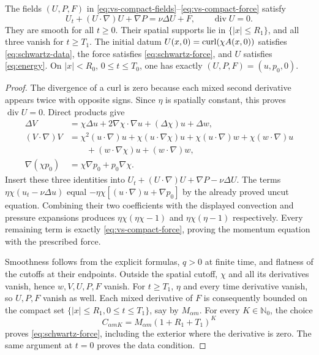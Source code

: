 \begin{proposition}
The fields $(U,P,F)$ in
\eqref{eq:vs-compact-fields}--\eqref{eq:vs-compact-force} satisfy
\[
 U_t+(U\cdot\nabla)U+\nabla P=\nu\Delta U+F,
 \qquad \operatorname{div}U=0.
\]
They are smooth for all $t\geq0$. Their spatial supports lie in
$\{|x|\leq R_1\}$, and all three vanish for $t\geq T_1$.
The initial datum $U(x,0)=\operatorname{curl}(\chi A(x,0))$ satisfies
\eqref{eq:schwartz-data}, the force satisfies
\eqref{eq:schwartz-force}, and $U$ satisfies \eqref{eq:energy}.
On $|x|<R_0$, $0\leq t\leq T_0$, one has exactly
$(U,P,F)=(u,p_0,0)$.
\end{proposition}
\begin{proof}
The divergence of a curl is zero because each mixed second derivative
appears twice with opposite signs. Since $\eta$ is spatially constant,
this proves $\operatorname{div}U=0$. Direct products give
\begin{align*}
 \Delta V&=\chi\Delta u+2\nabla\chi\cdot\nabla u
              +(\Delta\chi)u+\Delta w,\\
 (V\cdot\nabla)V
 &=\chi^2(u\cdot\nabla)u+\chi(u\cdot\nabla\chi)u
   +\chi(u\cdot\nabla)w+\chi(w\cdot\nabla)u\\
 &\qquad +(w\cdot\nabla\chi)u+(w\cdot\nabla)w,\\
 \nabla(\chi p_0)&=\chi\nabla p_0+p_0\nabla\chi.
\end{align*}
Insert these three identities into
$U_t+(U\cdot\nabla)U+\nabla P-\nu\Delta U$.
The terms $\eta\chi(u_t-\nu\Delta u)$ equal
$-\eta\chi[(u\cdot\nabla)u+\nabla p_0]$ by the already proved
uncut equation. Combining their two coefficients with the displayed
convection and pressure expansions produces
$\eta\chi(\eta\chi-1)$ and $\eta\chi(\eta-1)$ respectively.
Every remaining term is exactly \eqref{eq:vs-compact-force}, proving
the momentum equation with the prescribed force.

Smoothness follows from the explicit formulas, $q>0$ at finite time,
and flatness of the cutoffs at their endpoints. Outside the spatial
cutoff, $\chi$ and all its derivatives vanish, hence $w,V,U,P,F$
vanish. For $t\geq T_1$, $\eta$ and every time derivative vanish,
so $U,P,F$ vanish as well. Each mixed derivative of $F$ is consequently
bounded on the compact set $\{|x|\leq R_1,0\leq t\leq T_1\}$,
say by $M_{\alpha m}$. For every $K\in\mathbb N_0$, the choice
\[
 C_{\alpha mK}=M_{\alpha m}(1+R_1+T_1)^K
\]
proves \eqref{eq:schwartz-force}, including the exterior where the
derivative is zero. The same argument at $t=0$ proves the data condition.


\end{proof}
